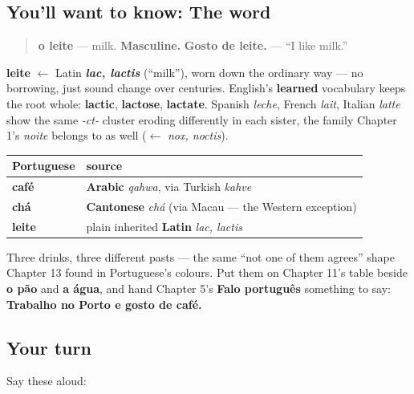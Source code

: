 \subsection*{You'll want to know: The word}
\begin{quote}
\textbf{o leite} — milk. \textbf{Masculine.} \textbf{Gosto de leite.} — \textquotedblleft{}I like milk.\textquotedblright{}
\end{quote}

\begin{cousinweb}
\textbf{leite} $\leftarrow$ Latin \emph{\textbf{lac, lactis}} (\textquotedblleft{}milk\textquotedblright{}), worn down the ordinary way — no borrowing, just sound change over centuries. English's \textbf{learned} vocabulary keeps the root whole: \textbf{lactic}, \textbf{lactose}, \textbf{lactate}. Spanish \emph{leche}, French \emph{lait}, Italian \emph{latte} show the same \emph{-ct-} cluster eroding differently in each sister, the family Chapter 1's \emph{noite} belongs to as well ($\leftarrow$ \emph{nox, noctis}).
\end{cousinweb}

\begin{grammarlens}[title={What you've built: The chapter in one table}]
\noindent
\begin{tabularx}{\linewidth}{@{}>{\raggedright\arraybackslash}X>{\raggedright\arraybackslash}X@{}}
\toprule
\textbf{Portuguese} & \textbf{source} \\
\midrule
\textbf{café} & \textbf{Arabic} \emph{qahwa}, via Turkish \emph{kahve} \\
\textbf{chá} & \textbf{Cantonese} \emph{chá} (via Macau — the Western exception) \\
\textbf{leite} & plain inherited \textbf{Latin} \emph{lac, lactis} \\
\bottomrule
\end{tabularx}

Three drinks, three different pasts — the same \textquotedblleft{}not one of them agrees\textquotedblright{} shape Chapter 13 found in Portuguese's colours. Put them on Chapter 11's table beside \textbf{o pão} and \textbf{a água}, and hand Chapter 5's \textbf{Falo português} something to say: \textbf{Trabalho no Porto e gosto de café.}
\end{grammarlens}

\subsection*{Your turn}
Say these aloud:

